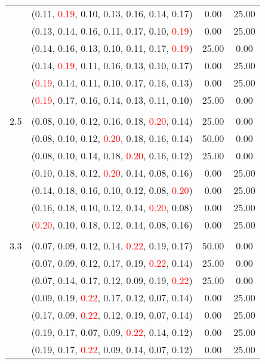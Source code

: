 \documentclass[10pt,a4paper]{report}
\begin{document}
\begin{center}
\begin{longtable}{clcc}
			&(0.11, \textcolor{red}{0.19}, \textcolor{black}{0.10}, 0.13, 0.16, 0.14, 0.17)&0.00&25.00\\
			&(0.13, 0.14, 0.16, 0.11, 0.17, \textcolor{black}{0.10}, \textcolor{red}{0.19})&0.00&25.00\\
			&(0.14, 0.16, 0.13, \textcolor{black}{0.10}, 0.11, 0.17, \textcolor{red}{0.19})&25.00&0.00\\
			&(0.14, \textcolor{red}{0.19}, 0.11, 0.16, 0.13, \textcolor{black}{0.10}, 0.17)&0.00&25.00\\
			&(\textcolor{red}{0.19}, 0.14, 0.11, \textcolor{black}{0.10}, 0.17, 0.16, 0.13)&0.00&25.00\\
			&(\textcolor{red}{0.19}, 0.17, 0.16, 0.14, 0.13, 0.11, \textcolor{black}{0.10})&25.00&0.00\\
		&&&\\
		2.5			&(\textcolor{black}{0.08}, 0.10, 0.12, 0.16, 0.18, \textcolor{red}{0.20}, 0.14)&25.00&0.00\\
			&(\textcolor{black}{0.08}, 0.10, 0.12, \textcolor{red}{0.20}, 0.18, 0.16, 0.14)&50.00&0.00\\
			&(\textcolor{black}{0.08}, 0.10, 0.14, 0.18, \textcolor{red}{0.20}, 0.16, 0.12)&25.00&0.00\\
			&(0.10, 0.18, 0.12, \textcolor{red}{0.20}, 0.14, \textcolor{black}{0.08}, 0.16)&0.00&25.00\\
			&(0.14, 0.18, 0.16, 0.10, 0.12, \textcolor{black}{0.08}, \textcolor{red}{0.20})&0.00&25.00\\
			&(0.16, 0.18, 0.10, 0.12, 0.14, \textcolor{red}{0.20}, \textcolor{black}{0.08})&0.00&25.00\\
			&(\textcolor{red}{0.20}, 0.10, 0.18, 0.12, 0.14, \textcolor{black}{0.08}, 0.16)&0.00&25.00\\
		&&&\\
		3.3			&(\textcolor{black}{0.07}, 0.09, 0.12, 0.14, \textcolor{red}{0.22}, 0.19, 0.17)&50.00&0.00\\
			&(\textcolor{black}{0.07}, 0.09, 0.12, 0.17, 0.19, \textcolor{red}{0.22}, 0.14)&25.00&0.00\\
			&(\textcolor{black}{0.07}, 0.14, 0.17, 0.12, 0.09, 0.19, \textcolor{red}{0.22})&25.00&0.00\\
			&(0.09, 0.19, \textcolor{red}{0.22}, 0.17, 0.12, \textcolor{black}{0.07}, 0.14)&0.00&25.00\\
			&(0.17, 0.09, \textcolor{red}{0.22}, 0.12, 0.19, \textcolor{black}{0.07}, 0.14)&0.00&25.00\\
			&(0.19, 0.17, \textcolor{black}{0.07}, 0.09, \textcolor{red}{0.22}, 0.14, 0.12)&0.00&25.00\\
			&(0.19, 0.17, \textcolor{red}{0.22}, 0.09, 0.14, \textcolor{black}{0.07}, 0.12)&0.00&25.00\\
		\bottomrule
	\end{longtable}
\end{center}
\end{document}
